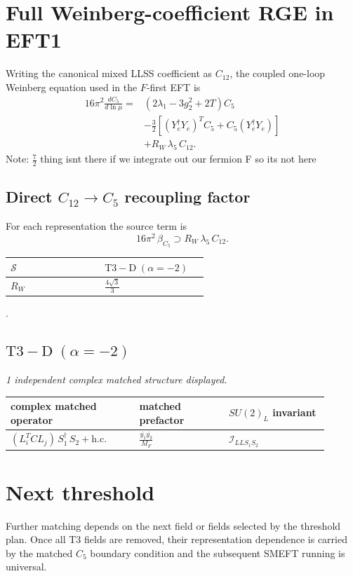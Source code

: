 \documentclass[9pt]{article}
\begin{document}
\section*{Full Weinberg-coefficient RGE in EFT1}
Writing the canonical mixed LLSS coefficient as $C_{12}$, the coupled one-loop Weinberg equation used in the $F$-first EFT is
\begin{align}
16\pi^2\frac{dC_5}{d\ln\mu}={}&(2\lambda_1-3g_2^2+2T)C_5\\
&-\frac32\left[(Y_e^\dagger Y_e)^T C_5+C_5(Y_e^\dagger Y_e)\right]\\
&+R_W\,\lambda_5\,C_{12}.
\end{align}
Note: $\frac{7}{2}$ thing isnt there if we integrate out our fermion F so its not here \subsection*{Direct $C_{12}\to C_5$ recoupling factor}
For each representation the source term is
\[16\pi^2\,\beta_{C_5}\supset R_W\,\lambda_5\,C_{12}.\]
\begin{longtable}{@{}p{0.37\linewidth}p{0.19\linewidth}@{}}
\toprule
$\mathcal{S}$ & $ \mathrm{T3-D}\;(\alpha=-2) $ \\
\midrule
$R_W$ & $ \frac{4 \sqrt{3}}{3} $ \\
\bottomrule
\end{longtable}
.
\subsection*{$ \mathrm{T3-D}\;(\alpha=-2) $}
\textit{1 independent complex matched structure displayed. }
\begin{longtable}{@{}p{0.36\linewidth}p{0.25\linewidth}p{0.29\linewidth}@{}}
\toprule
complex matched operator & matched prefactor & $SU(2)_L$ invariant \\
\midrule
$ (L_i^T C L_j)\,S_1^\dagger\,S_2+\mathrm{h.c.} $ & $ \frac{\overline{y_{1}} \overline{y_{2}}}{M_F} $ & $ \mathcal{I}_{LLS_1S_2} $ \\
\bottomrule
\end{longtable}
\section*{Next threshold}
Further matching depends on the next field or fields selected by the threshold plan.  Once all T3 fields are removed, their representation dependence is carried by the matched $C_5$ boundary condition and the subsequent SMEFT running is universal.
\clearpage
\end{document}
